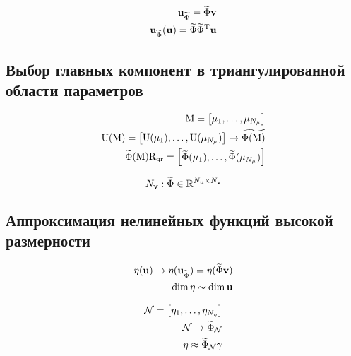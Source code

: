 \begin{align}
    \unk_{\widetilde{\Phi}} = \widetilde{\Phi} \vunk \\
    \unk_{\widetilde{\Phi}}(\unk) = \widetilde{\Phi} \transpose{\widetilde{\Phi}} \unk
\end{align}

\subsection{Выбор главных компонент в триангулированной области параметров}

\begin{align}
    \matr{M} =\begin{bmatrix}
        \param_1, \dots, \param_{N_\param}
    \end{bmatrix}\\
    \matr{U}(\matr{M}) =
    \begin{bmatrix}
        \matr{U}(\param_1), \dots, \matr{U}(\param_{N_\param})
    \end{bmatrix}
    \rightarrow \widetilde{\Phi (\matr{M})} \\
    \widetilde{\Phi} (\matr{M}) \matr{R}_\text{qr} =
    \begin{bmatrix}
        \widetilde{\Phi}(\param_1), \dots,  \widetilde{\Phi}(\param_{N_\param})
    \end{bmatrix}
\end{align}

\begin{equation}
N_{\mathbf{v}} : \widetilde{\Phi} \in \mathbb{R}^{N_{\mathbf{u}} \times N_{\mathbf{v}}}
\end{equation}

\subsection{Аппроксимация нелинейных функций высокой размерности}

\begin{align}
 \mathbf{\eta}(\mathbf{u}) \rightarrow \mathbf{\eta} (\mathbf{u}_{\widetilde{\Phi}}) = \mathbf{\eta} (\widetilde{\Phi} \mathbf{v}) \\
 \dim{\mathbf{\eta}} \sim \dim{\mathbf{u}}
\end{align}

\begin{align}
    \mathcal{N} =
    \begin{bmatrix}
        \mathbf{\eta}_1, \dots,  \mathbf{\eta}_{N_{\mathbf{\eta}}}
    \end{bmatrix} \\
    \mathcal{N} \rightarrow \widetilde{\Phi}_\mathcal{N} \\
    \mathbf{\eta} \approx \widetilde{\Phi}_\mathcal{N} \mathbf{\gamma}
\end{align}

